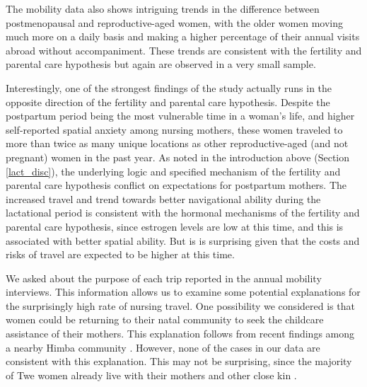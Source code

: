 The mobility data also shows intriguing trends in the difference between postmenopausal and reproductive-aged women, with the older women moving much more on a daily basis and making a higher percentage of their annual visits abroad without accompaniment.  These trends are consistent with the fertility and parental care hypothesis but again are observed in a very small sample.

Interestingly, one of the strongest findings of the study actually runs in the opposite direction of the fertility and parental care hypothesis.  Despite the postpartum period being the most vulnerable time in a woman's life, and higher self-reported spatial anxiety among nursing mothers, these women traveled to more than twice as many unique locations as other reproductive-aged (and not pregnant) women in the past year.  As noted in the introduction above (Section \ref{lact_disc}), the underlying logic and specified mechanism of the fertility and parental care hypothesis conflict on expectations for postpartum mothers.  The increased travel and trend towards better navigational ability during the lactational period is consistent with the hormonal mechanisms of the fertility and parental care hypothesis, since estrogen levels are low at this time, and this is associated with better spatial ability.  But is is surprising given that the costs and risks of travel are expected to be higher at this time.

We asked about the purpose of each trip reported in the annual mobility interviews.  This information allows us to examine some potential explanations for the surprisingly high rate of nursing travel.  One possibility we considered is that women could be returning to their natal community to seek the childcare assistance of their mothers.  This explanation follows from recent findings among a nearby Himba community  \citep{scelza2011female}.  However, none of the cases in our data are consistent with this explanation.  This may not be surprising, since the majority of Twe women already live with their mothers and other close kin \citep{vashro2014residence}.  


